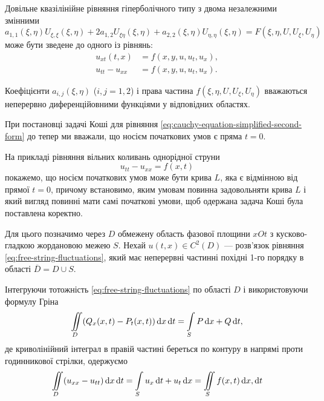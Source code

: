 Довільне квазілінійне рівняння гіперболічного типу з двома незалежними змінними
\begin{equation}
    a_{1, 1} (\xi, \eta) U_{\xi, \xi} (\xi, \eta) + 2 a_{1, 2} U_{\xi \eta}(\xi, \eta) + a_{2, 2} (\xi, \eta) U_{\eta, \eta}(\xi, \eta) = F(\xi, \eta, U, U_\xi, U_\eta)
\end{equation}
може бути зведене до одного із рівнянь:
\begin{align}
    \label{eq:cauchy-equation-simplified-first-form}
    u_{xt}(t,x) &= f(x, y, u, u_t, u_x), \\
    \label{eq:cauchy-equation-simplified-second-form}
    u_{tt} - u_{xx} &= f(x, y, u, u_t, u_x).
\end{align}

\begin{remark}
    Коефіцієнти $a_{i,j}(\xi,\eta)$ ($i, j = 1, 2$) і права частина $f(\xi, \eta, U, U_\xi, U_\eta)$ вважаються неперервно диференційовними функціями у відповідних областях.
\end{remark}

При постановці задачі Коші для рівняння \eqref{eq:cauchy-equation-simplified-second-form} до тепер ми вважали, що носієм початкових умов є пряма $t = 0$. \medskip

На прикладі рівняння вільних коливань однорідної струни
\begin{equation}
    \label{eq:free-string-fluctuations}
    u_{tt} - u_{xx} = f(x, t)
\end{equation}
покажемо, що носієм початкових умов може бути крива $L$, яка є відмінною від прямої $t = 0$, причому встановимо, яким умовам повинна задовольняти крива $L$ і який вигляд повинні мати самі початкові умови, щоб одержана задача Коші була поставлена коректно. \medskip

Для цього позначимо через $D$ обмежену область фазової площини $xOt$ з кусково-гладкою жордановою межею $S$. Нехай $u(t, x) \in C^2(D)$ --- розв'язок рівняння \eqref{eq:free-string-fluctuations}, який має неперервні частинні похідні 1-го порядку в області $\overline{D} = D \cup S$. \medskip

Інтегруючи тотожність \eqref{eq:free-string-fluctuations} по області $D$ і використовуючи формулу Гріна
\begin{equation}
    \displaystyle\iint\limits_D (Q_x(x, t) - P_t(x, t)) \mathop{}\!\mathrm{d} x \mathop{}\!\mathrm{d} t = \displaystyle\int\limits_S P \mathop{}\!\mathrm{d} x + Q \mathop{}\!\mathrm{d} t,
\end{equation}
де криволінійний інтеграл в правій частині береться по контуру в напрямі проти годинникової стрілки, одержуємо
\begin{equation}
    \displaystyle\iint\limits_D (u_{xx} - u_{tt}) \mathop{}\!\mathrm{d} x \mathop{}\!\mathrm{d} t = \displaystyle\int\limits_S u_x \mathop{}\!\mathrm{d} t + u_t \mathop{}\!\mathrm{d} x = \displaystyle\iint\limits_S f(x, t) \mathop{}\!\mathrm{d} x, \mathop{}\!\mathrm{d} t
\end{equation}

